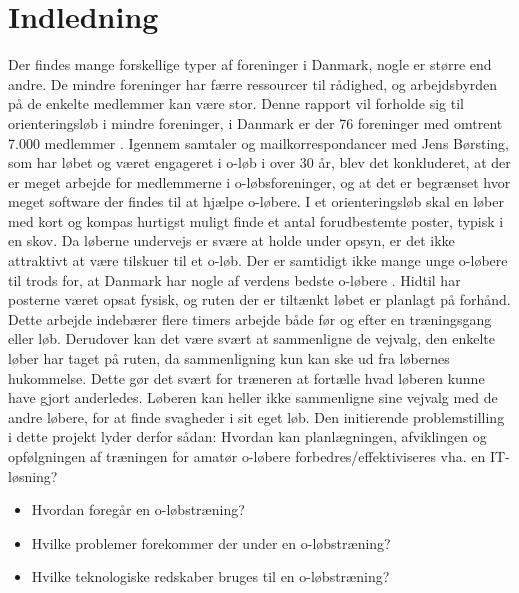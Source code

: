 \chapter{Indledning}
Der findes mange forskellige typer af foreninger i Danmark, nogle er større end andre. De mindre foreninger har færre ressourcer til rådighed, og arbejdsbyrden på de enkelte medlemmer kan være stor.\newline
Denne rapport vil forholde sig til orienteringsløb i mindre foreninger, i Danmark er der 76 foreninger med omtrent 7.000 medlemmer \citep{DIF}. Igennem samtaler og mailkorrespondancer med Jens Børsting, som har løbet og været engageret i o-løb i over 30 år, blev det konkluderet, at der er meget arbejde for medlemmerne i o-løbsforeninger, og at det er begrænset hvor meget software der findes til at hjælpe o-løbere. \newline
I et orienteringsløb skal en løber med kort og kompas hurtigst muligt finde et antal forudbestemte poster, typisk i en skov. Da løberne undervejs er svære at holde under opsyn, er det ikke attraktivt at være tilskuer til et o-løb. Der er samtidigt ikke mange unge o-løbere til trods for, at Danmark har nogle af verdens bedste o-løbere \citep{RANK}. \newline
Hidtil har posterne været opsat fysisk, og ruten der er tiltænkt løbet er planlagt på forhånd. Dette arbejde indebærer flere timers arbejde både før og efter en træningsgang eller løb. Derudover kan det være svært at sammenligne de vejvalg, den enkelte løber har taget på ruten, da sammenligning kun kan ske ud fra løbernes hukommelse. Dette gør det svært for træneren at fortælle hvad løberen kunne have gjort anderledes. Løberen kan heller ikke sammenligne sine vejvalg med de andre løbere, for at finde svagheder i sit eget løb. \newline
Den initierende problemstilling i dette projekt lyder derfor sådan:\newline
Hvordan kan planlægningen, afviklingen og opfølgningen af træningen for amatør o-løbere forbedres/effektiviseres vha. en IT-løsning?
\begin{itemize}
	\item Hvordan foregår en o-løbstræning?
	\item Hvilke problemer forekommer der under en o-løbstræning?
	\item Hvilke teknologiske redskaber bruges til en o-løbstræning?	
\end{itemize} 

